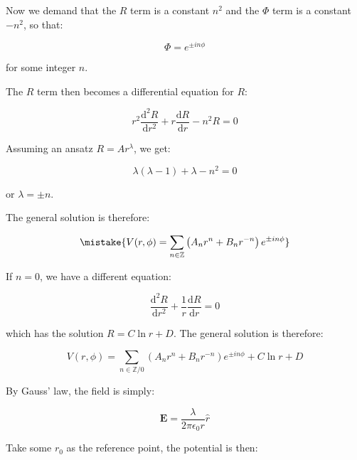 \documentclass[12pt]{article}
\begin{document}
Now we demand that the $R$ term is a constant $n^{2}$ and the $\Phi$ term is a constant $-n^{2}$, so that:

\begin{equation}
    \Phi = e^{\pm in\phi}
\end{equation}

for some integer $n$. 

The $R$ term then becomes a differential equation for $R$:

\begin{equation}
    r^{2} \frac{\mathrm{d}^{2}R}{\mathrm{d}r^{2}} + r \frac{\mathrm{d}R}{\mathrm{d}r} - n^{2} R = 0
\end{equation}

Assuming an ansatz $R = Ar^{\lambda}$, we get:

\begin{equation}
    \lambda(\lambda - 1) + \lambda - n^{2} = 0
\end{equation}

or $\lambda = \pm n$.

The general solution is therefore:

\begin{equation}
    \mistake{V(r, \phi) = \sum_{n \in \mathbb{Z}} \left( A_{n} r^{n} + B_{n} r^{-n} \right) e^{\pm in\phi}}
\end{equation}

\begin{correction}
    If $n = 0$, we have a different equation:

    \begin{equation}
        \frac{\mathrm{d}^{2}R}{\mathrm{d}r^{2}} + \frac{1}{r} \frac{\mathrm{d}R}{\mathrm{d}r} = 0
    \end{equation}

    which has the solution $R = C\ln{r} + D$. The general solution is therefore:

    \begin{equation}
        V(r, \phi) = \sum_{n \in \mathbb{Z}/0} \left( A_{n} r^{n} + B_{n} r^{-n} \right) e^{\pm in\phi} + C\ln{r} + D
    \end{equation}
\end{correction}

By Gauss' law, the field is simply:

\begin{equation}
    \mathbf{E} = \frac{\lambda}{2\pi\epsilon_{0}r} \hat{r}
\end{equation}

Take some $r_{0}$ as the reference point, the potential is then:
\end{document}

